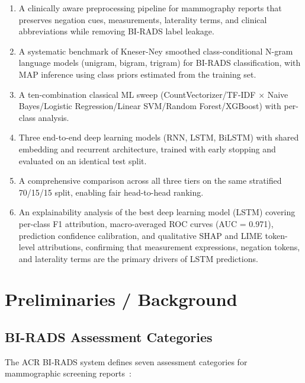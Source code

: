 \documentclass[11pt,a4paper]{article}
\begin{document}
\begin{enumerate}[label=(\roman*)]
  \item A clinically aware preprocessing pipeline for mammography reports that
        preserves negation cues, measurements, laterality terms, and
        clinical abbreviations while removing BI-RADS label leakage.
  \item A systematic benchmark of Kneser-Ney smoothed class-conditional
        N-gram language models (unigram, bigram, trigram) for BI-RADS
        classification, with MAP inference using class priors estimated from
        the training set.
  \item A ten-combination classical ML sweep (CountVectorizer/TF-IDF $\times$
        Naive Bayes/Logistic Regression/Linear SVM/Random Forest/XGBoost)
        with per-class analysis.
  \item Three end-to-end deep learning models (RNN, LSTM, BiLSTM) with
        shared embedding and recurrent architecture, trained with early stopping
        and evaluated on an identical test split.
  \item A comprehensive comparison across all three tiers on the same
        stratified 70/15/15 split, enabling fair head-to-head ranking.
  \item An explainability analysis of the best deep learning model (LSTM)
        covering per-class F1 attribution, macro-averaged ROC curves
        (AUC = 0.971), prediction confidence calibration, and qualitative
        SHAP and LIME token-level attributions, confirming that measurement
        expressions, negation tokens, and laterality terms are the
        primary drivers of LSTM predictions.
\end{enumerate}

\section{Preliminaries / Background}

\subsection{BI-RADS Assessment Categories}

The ACR BI-RADS system defines seven assessment categories for mammographic
screening reports~\cite{acr2013}:
\end{document}
